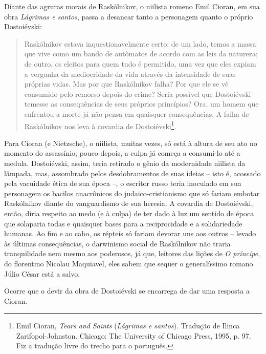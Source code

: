 Diante das agruras morais de Raskólnikov, o niilista romeno Emil Cioran,
em sua obra \emph{Lágrimas e santos}, passa a desancar tanto a
personagem quanto o próprio Dostoiévski:

\begin{quote}
Raskólnikov estava inquestionavelmente certo: de um lado, temos a massa
que vive como um bando de autômatos de acordo com as leis da natureza;
de outro, os eleitos para quem tudo é permitido, uma vez que eles expiam
a vergonha da mediocridade da vida através da intensidade de suas
próprias vidas. Mas por que Raskólnikov falha? Por que ele se vê
consumido pelo remorso depois do crime? Seria possível que Dostoiévski
temesse as consequências de seus próprios princípios? Ora, um homem que
enfrentou a morte já não pensa em quaisquer consequências. A falha de
Raskólnikov nos leva à covardia de Dostoiévski\footnote{Emil Cioran,
  \emph{Tears and Saints} (\emph{Lágrimas e santos})\emph{.} Tradução de
  Ilinca Zarifopol-Johnston. Chicago: The University of Chicago Press,
  1995, p. 97. Fiz a tradução livre do trecho para o português.}.
\end{quote}

Para Cioran (e Nietzsche), o niilista, muitas vezes, só está à altura de
seu ato no momento do assassínio; pouco depois, a culpa já começa a
consumi-lo até a medula. Dostoiévski, assim, teria retirado o gênio da
modernidade niilista da lâmpada, mas, assombrado pelos desdobramentos de
suas ideias -- isto é, acossado pela vacuidade ética de sua época --, o
escritor russo teria inoculado em sua personagem os bacilos anacrônicos
do judaico-cristianismo que só fariam embotar Raskólnikov diante do
vanguardismo de sua heresia. A covardia de Dostoiévski, então, diria
respeito ao medo (e à culpa) de ter dado à luz um sentido de época que
solaparia todas e quaisquer bases para a reciprocidade e a solidariedade
humanas. Ao fim e ao cabo, os répteis só fariam devorar uns aos outros
-- levado às últimas consequências, o darwinismo social de Raskólnikov
não traria tranquilidade nem mesmo aos poderosos, já que, leitores das
lições de \emph{O príncipe}, do florentino Nicolau Maquiavel, eles sabem
que sequer o generalíssimo romano Júlio César está a salvo.

Ocorre que o devir da obra de Dostoiévski se encarrega de dar uma
resposta a Cioran.

